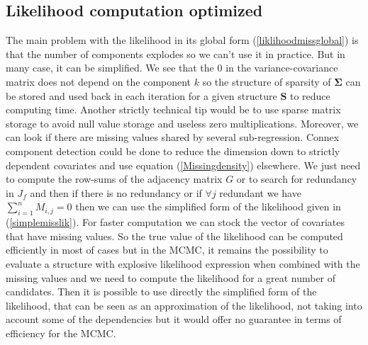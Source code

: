 \documentclass[12pt,a4paper]{report}
\begin{document}
	\subsection{Likelihood computation optimized}
	The main problem with the likelihood in its global form (\ref{liklihoodmissglobal}) is that the number of components explodes so we can't use it in practice. But in many case, it can be simplified.
We see that the $0$ in the variance-covariance matrix does not depend on the component $k$ so the structure of sparsity of $\boldsymbol{\Sigma}$ can be stored and used back in each iteration for a given structure $\boldsymbol{S}$ to reduce computing time.  Another strictly technical tip would be to use sparse matrix storage to avoid null value storage and useless zero multiplications.
		Moreover, we can look if there are missing values shared by several sub-regression. 
		Connex component detection could be done to reduce the dimension down to strictly dependent covariates and use equation (\ref{Missingdensity}) elsewhere.
		We just need to compute the  row-sums of the adjacency matrix $G$ or to search for redundancy in $J_f$ and then if there is no redundancy or if $\forall j$ redundant we have $\sum_{i=1}^nM_{i,j}=0$ then we can use the simplified form of the likelihood given in (\ref{simplemisslik}). For faster computation we can stock the vector of covariates that have missing values.
		So the true value of the likelihood can be computed efficiently in most of cases but in the MCMC, it remains the possibility to evaluate a structure with explosive likelihood expression when combined with the missing values and we need to compute the likelihood for a great number of candidates. Then it is possible to use directly the simplified form of the likelihood, that can be seen as an approximation of the likelihood, not taking into account some of the dependencies but it would offer no guarantee in terms of efficiency for the MCMC. %
\end{document}
